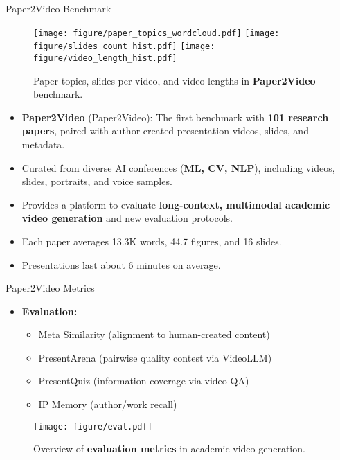 \documentclass{beamer}
\newcommand{\alertterm}[1]{\alert{\textbf{#1}}}
\newcommand{\bench}{Paper2Video}
\begin{document}
\begin{frame}{Paper2Video Benchmark}
  \begin{figure}
    \centering
    \texttt{[image: figure/paper\_topics\_wordcloud.pdf]}
    \texttt{[image: figure/slides\_count\_hist.pdf]}
    \texttt{[image: figure/video\_length\_hist.pdf]}
    \caption{Paper topics, slides per video, and video lengths in \alertterm{Paper2Video} benchmark.}
    \label{fig:stat}
  \end{figure}
  \vspace{-1\baselineskip}
   \scriptsize
  \begin{itemize}
    \item \alertterm{Paper2Video} (\bench): The first benchmark with \alertterm{101 research papers}, paired with author-created presentation videos, slides, and metadata.
    \item Curated from diverse AI conferences (\alertterm{ML, CV, NLP}), including videos, slides, portraits, and voice samples.
    \item Provides a platform to evaluate \alertterm{long-context, multimodal academic video generation} and new evaluation protocols.
  \end{itemize}
  
  \begin{itemize}
    \item Each paper averages 13.3K words, 44.7 figures, and 16 slides.
    \item Presentations last about 6 minutes on average.
  \end{itemize}
\end{frame}

\begin{frame}{{\bench} Metrics}
  \begin{itemize}
    \item \alertterm{Evaluation:}
      \begin{itemize}
          \item Meta Similarity (alignment to human-created content)
          \item PresentArena (pairwise quality contest via VideoLLM)
          \item PresentQuiz (information coverage via video QA)
          \item IP Memory (author/work recall)
      \end{itemize}
  \end{itemize}
  \vspace{0.2cm}
  \begin{figure}
    \texttt{[image: figure/eval.pdf]}
    \caption{Overview of \alertterm{evaluation metrics} in academic video generation.}
    \label{fig:eval}
  \end{figure}
\end{frame}
\end{document}
